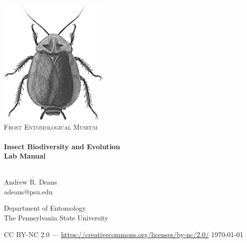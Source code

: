 \begin{titlepage}
\vbox{ }

\vbox{ }

\begin{center}
\includegraphics[width=0.4\textwidth]{sections/img/cockroachCover.pdf}\\[1cm]
\textsc{\LARGE Frost Entomological Museum}\\[1.5cm]

\vbox{ }
\HRule \\[0.4cm]
{ \huge \bfseries Insect Biodiversity and Evolution\\\vspace{3mm}
Lab Manual}\\[0.4cm]
\HRule \\[1.5cm]
\begin{minipage}{0.3\textwidth}
\begin{flushleft} \large
Andrew R. Deans\\
adeans@psu.edu
\end{flushleft}
\end{minipage}
\begin{minipage}{0.6\textwidth}
\begin{flushright}
Department of Entomology\\
The Pennsylvania State University
\end{flushright}
\end{minipage}
\vfill
\large{}CC BY-NC 2.0 --- \centering\url{https://creativecommons.org/licenses/by-nc/2.0/}
\vfill
{\large\today}
\end{center}
\end{titlepage}

